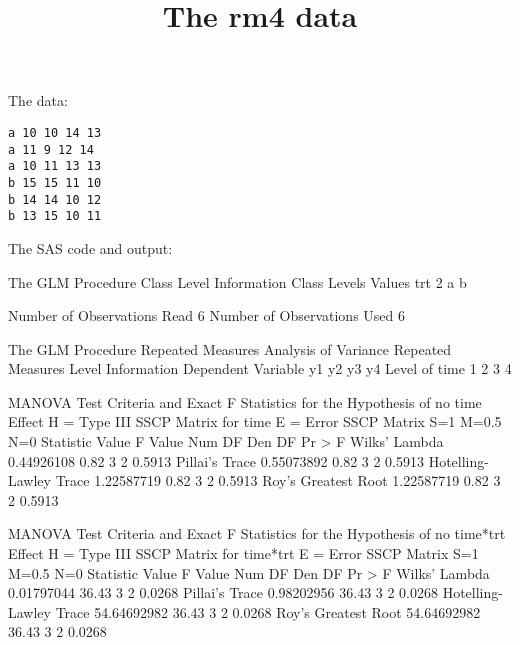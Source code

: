 \documentclass{article}
\title{The rm4 data}
\begin{document}
\maketitle
The data:
\begin{verbatim}
a 10 10 14 13
a 11 9 12 14
a 10 11 13 13
b 15 15 11 10 
b 14 14 10 12
b 13 15 10 11 
\end{verbatim}
The SAS code and output:
\begin{Woutput}
The GLM Procedure
   Class Level Information
Class         Levels    Values
trt                2    a b

Number of Observations Read           6
Number of Observations Used           6

The GLM Procedure
Repeated Measures Analysis of Variance
           Repeated Measures Level Information
Dependent Variable          y1       y2       y3       y4
     Level of time           1        2        3        4

                MANOVA Test Criteria and Exact F Statistics
                   for the Hypothesis of no time Effect
                     H = Type III SSCP Matrix for time
                           E = Error SSCP Matrix
                            S=1    M=0.5    N=0
Statistic                       Value   F Value   Num DF   Den DF   Pr > F
Wilks' Lambda              0.44926108      0.82        3        2   0.5913
Pillai's Trace             0.55073892      0.82        3        2   0.5913
Hotelling-Lawley Trace     1.22587719      0.82        3        2   0.5913
Roy's Greatest Root        1.22587719      0.82        3        2   0.5913

                MANOVA Test Criteria and Exact F Statistics
                 for the Hypothesis of no time*trt Effect
                   H = Type III SSCP Matrix for time*trt
                           E = Error SSCP Matrix
                            S=1    M=0.5    N=0
Statistic                       Value   F Value   Num DF   Den DF   Pr > F
Wilks' Lambda              0.01797044     36.43        3        2   0.0268
Pillai's Trace             0.98202956     36.43        3        2   0.0268
Hotelling-Lawley Trace    54.64692982     36.43        3        2   0.0268
Roy's Greatest Root       54.64692982     36.43        3        2   0.0268


\end{Woutput}
\end{document}
